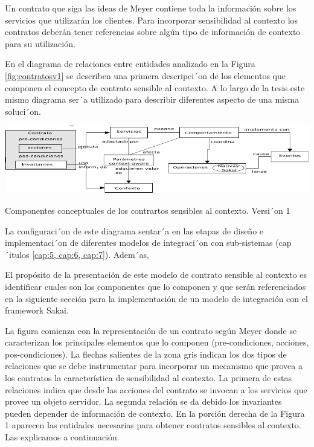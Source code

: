 Un contrato que siga las ideas de Meyer contiene toda la información
sobre los servicios que utilizarán los clientes. Para incorporar sensibilidad
al contexto los contratos deberán tener referencias sobre algún tipo de
información de contexto para su utilización.


En el diagrama de relaciones entre entidades analizado en la Figura
\ref{fig:contratosv1} se describen una primera descripci´on de los elementos
que componen el concepto de contrato sensible al contexto. A lo largo de la
tesis este mismo diagrama ser´a utilizado para describir diferentes aspecto de
una misma soluci´on. 

\begin{figura} [h!]
\begin{center}
 \includegraphics[width=5 in,totalheight=4 in] {Ch0/f1}
\caption{Componentes conceptuales de los contrartos sensibles al contexto.
Versi´on 1} \label{fig:contratosv1 }
\end{center}
\end{figura}

La configuraci´on de este diagrama sentar´a en las etapas de dise\~no e
implementaci´on de diferentes modelos de integraci´on con sub-sistemas
(cap´itulos \ref{cap:5, cap:6, cap:7}). Adem´as,


El propósito de la presentación de este modelo de contrato sensible al
contexto es identificar cuales son los componentes que lo componen y que serán
referenciados en la siguiente sección para la implementación de un modelo de
integración con el framework Sakai.

La figura comienza con la representación de un contrato según Meyer donde se
caracterizan los principales elementos que lo componen (pre-condiciones,
acciones, pos-condiciones). La flechas salientes de la zona gris indican los dos
tipos de relaciones que se debe instrumentar para incorporar un mecanismo que
provea a los contratos la característica de sensibilidad al contexto. La
primera de estas relaciones indica que desde las acciones del contrato se
invocan a los servicios que provee un objeto servidor. La segunda relación se
da debido los invariantes pueden depender de información de contexto. En la
porción derecha de la Figura 1 aparecen las entidades necesarias para obtener
contratos sensibles al contexto. Las explicamos a continuación.


